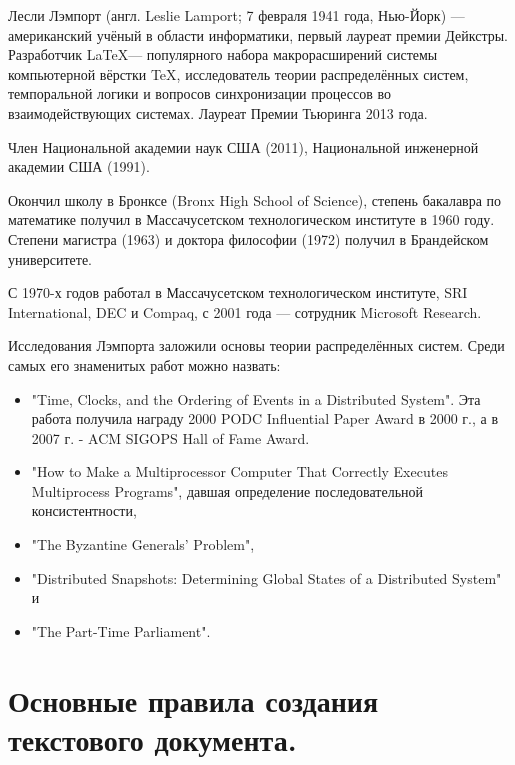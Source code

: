 \documentclass[a4paper,12pt]{article} %
\begin{document}
Лесли Лэмпорт (англ. Leslie Lamport; 7 февраля 1941 года, Нью-Йорк) — американский учёный в области информатики, первый лауреат премии Дейкстры. Разработчик \LaTeX — популярного набора макрорасширений системы компьютерной вёрстки \TeX, исследователь теории распределённых систем, темпоральной логики и вопросов синхронизации процессов во взаимодействующих системах. Лауреат Премии Тьюринга 2013 года.

Член Национальной академии наук США (2011), Национальной инженерной академии США (1991).

Окончил школу в Бронксе (Bronx High School of Science), степень бакалавра по математике получил в Массачусетском технологическом институте в 1960 году. Степени магистра (1963) и доктора философии (1972) получил в Брандейском университете.

С 1970-х годов работал в Массачусетском технологическом институте, SRI International, DEC и Compaq, с 2001 года — сотрудник Microsoft Research.

Исследования Лэмпорта заложили основы теории распределённых систем. Среди самых его знаменитых работ можно назвать:
\begin{itemize}
\item "Time, Clocks, and the Ordering of Events in a Distributed System". Эта работа получила награду 2000 PODC Influential Paper Award в 2000 г., а в 2007 г. - ACM SIGOPS Hall of Fame Award.
\item "How to Make a Multiprocessor Computer That Correctly Executes Multiprocess Programs", давшая определение последовательной консистентности,
\item "The Byzantine Generals' Problem",
\item "Distributed Snapshots: Determining Global States of a Distributed System" и
\item "The Part-Time Parliament".
\end{itemize}
\section*{Основные правила создания текстового документа.}
\end{document}
